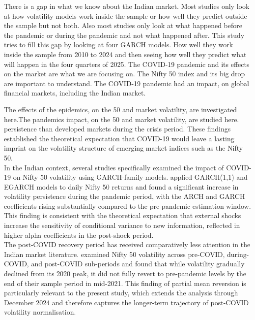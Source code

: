 There is a gap in what we know about the Indian market. Most studies only look at how volatility models work inside the sample or how well they predict outside the sample but not both. Also most studies only look at what happened before the pandemic or during the pandemic and not what happened after. This study tries to fill this gap by looking at four GARCH models. How well they work inside the sample from 2010 to 2024 and then seeing how well they predict what will happen in the four quarters of 2025. The COVID-19 pandemic and its effects on the market are what we are focusing on. The Nifty 50 index and its big drop are important to understand. The COVID-19 pandemic had an impact, on global financial markets, including the Indian market.

The effects of the epidemics, on the 50 and market volatility, are investigated here.The pandemics impact, on the 50 and market volatility, are studied here. persistence than developed markets during the crisis period. These findings established the theoretical expectation that COVID-19 would leave a lasting imprint on the volatility structure of emerging market indices such as the Nifty 50.\\
In the Indian context, several studies specifically examined the impact of COVID-19 on Nifty 50 volatility using GARCH-family models. \cite{mishra2020} applied GARCH(1,1) and EGARCH models to daily Nifty 50 returns and found a significant increase in volatility persistence during the pandemic period, with the ARCH and GARCH coefficients rising substantially compared to the pre-pandemic estimation window. This finding is consistent with the theoretical expectation that external shocks increase the sensitivity of conditional variance to new information, reflected in higher alpha coefficients in the post-shock period.\\
The post-COVID recovery period has received comparatively less attention in the Indian market literature. \cite{rai2022} examined Nifty 50 volatility across pre-COVID, during-COVID, and post-COVID sub-periods and found that while volatility gradually declined from its 2020 peak, it did not fully revert to pre-pandemic levels by the end of their sample period in mid-2021. This finding of partial mean reversion is particularly relevant to the present study, which extends the analysis through December 2024 and therefore captures the longer-term trajectory of post-COVID volatility normalisation.\\

